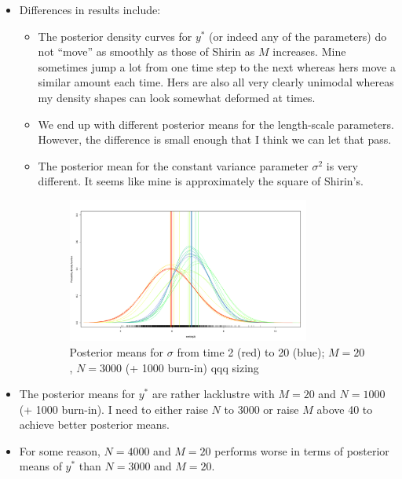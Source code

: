 \documentclass{sfuthesis}
\begin{document}
\begin{itemize}
  \item Differences in results include:
  
  \begin{itemize}

    \item The posterior density curves for $y^*$ (or indeed any of the parameters) do not ``move'' as smoothly as those of Shirin as $M$ increases. Mine sometimes jump a lot from one time step to the next whereas hers move a similar amount each time. Hers are also all very clearly unimodal whereas my density shapes can look somewhat deformed at times.
    \item We end up with different posterior means for the length-scale parameters. However, the difference is small enough that I think we can let that pass. 
    \item The posterior mean for the constant variance parameter $\sigma^2$ is very different. It seems like mine is approximately the square of Shirin's. 

\begin{figure}[H]
  \begin{center}
    \includegraphics[width=0.8\textwidth]{ex2sigma.png}
    \vspace{0.1mm}
    \caption{Posterior means for $\sigma$ from time 2 (red) to 20 (blue); $M = 20$, $N = 3000$ (+ 1000 burn-in) qqq sizing}
    \label{sigma}
  \end{center}
\end{figure}

  \end{itemize}
  
  \item The posterior means for $y^*$ are rather lacklustre with $M = 20$ and $N = 1000$ (+ 1000 burn-in). I need to either raise $N$ to 3000 or raise $M$ above 40 to achieve better posterior means. 
  \item For some reason, $N = 4000$ and $M = 20$ performs worse in terms of posterior means of $y^*$ than $N = 3000$ and $M = 20$.
  

\end{itemize}
\end{document}
